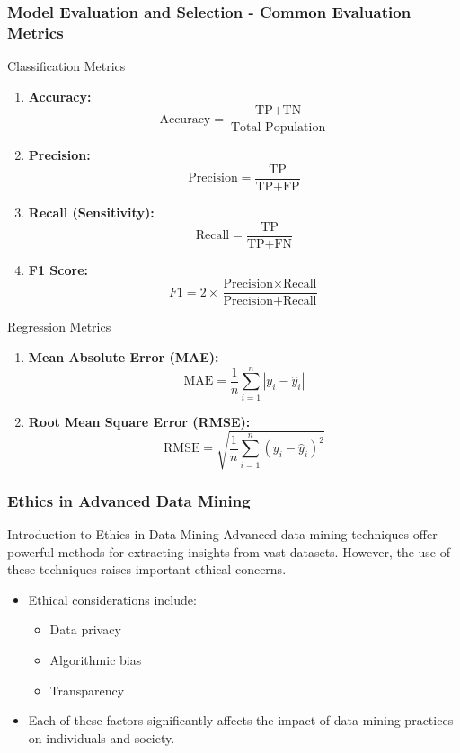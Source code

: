\documentclass{beamer}
\begin{document}
\begin{frame}[fragile]
    \frametitle{Model Evaluation and Selection - Common Evaluation Metrics}
    \begin{block}{Classification Metrics}
        \begin{enumerate}
            \item \textbf{Accuracy:} \[ \text{Accuracy} = \frac{\text{TP} + \text{TN}}{\text{Total Population}} \]
            \item \textbf{Precision:} \[ \text{Precision} = \frac{\text{TP}}{\text{TP} + \text{FP}} \]
            \item \textbf{Recall (Sensitivity):} \[ \text{Recall} = \frac{\text{TP}}{\text{TP} + \text{FN}} \]
            \item \textbf{F1 Score:} \[ F1 = 2 \times \frac{\text{Precision} \times \text{Recall}}{\text{Precision} + \text{Recall}} \]
        \end{enumerate}
    \end{block}
    \begin{block}{Regression Metrics}
        \begin{enumerate}
            \item \textbf{Mean Absolute Error (MAE):} \[ \text{MAE} = \frac{1}{n}\sum_{i=1}^{n} |y_i - \hat{y}_i| \]
            \item \textbf{Root Mean Square Error (RMSE):} \[ \text{RMSE} = \sqrt{\frac{1}{n}\sum_{i=1}^{n} (y_i - \hat{y}_i)^2} \]
        \end{enumerate}
    \end{block}
\end{frame}

\begin{frame}[fragile]
    \frametitle{Ethics in Advanced Data Mining}
    
    \begin{block}{Introduction to Ethics in Data Mining}
        Advanced data mining techniques offer powerful methods for extracting insights from vast datasets. However, the use of these techniques raises important ethical concerns.
    \end{block}
    
    \begin{itemize}
        \item Ethical considerations include:
        \begin{itemize}
            \item Data privacy
            \item Algorithmic bias
            \item Transparency
        \end{itemize}
        \item Each of these factors significantly affects the impact of data mining practices on individuals and society.
    \end{itemize}
\end{frame}
\end{document}
